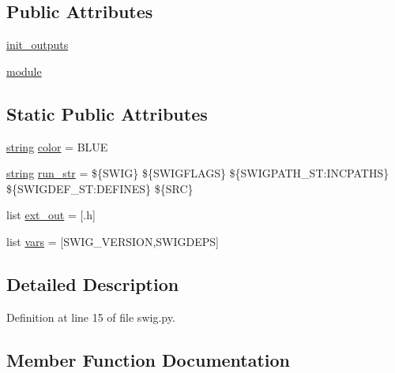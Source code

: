 \subsection*{Public Attributes}
\begin{DoxyCompactItemize}
\item 
\hyperlink{classwaflib_1_1extras_1_1swig_1_1swig_ac87a5e930d61bca4ddb0ba12c6df5dbd}{init\+\_\+outputs}
\item 
\hyperlink{classwaflib_1_1extras_1_1swig_1_1swig_a6008e295101b80084cb97379fe5d6db2}{module}
\end{DoxyCompactItemize}
\subsection*{Static Public Attributes}
\begin{DoxyCompactItemize}
\item 
\hyperlink{test__lib_f_l_a_c_2format_8c_ab02026ad0de9fb6c1b4233deb0a00c75}{string} \hyperlink{classwaflib_1_1extras_1_1swig_1_1swig_ae039b376a626bf5a5baa086264bb14c3}{color} = \textquotesingle{}B\+L\+UE\textquotesingle{}
\item 
\hyperlink{test__lib_f_l_a_c_2format_8c_ab02026ad0de9fb6c1b4233deb0a00c75}{string} \hyperlink{classwaflib_1_1extras_1_1swig_1_1swig_a0fd93de830f05b89980161c171372191}{run\+\_\+str} = \textquotesingle{}\$\{S\+W\+IG\} \$\{S\+W\+I\+G\+F\+L\+A\+GS\} \$\{S\+W\+I\+G\+P\+A\+T\+H\+\_\+\+S\+T\+:\+I\+N\+C\+P\+A\+T\+HS\} \$\{S\+W\+I\+G\+D\+E\+F\+\_\+\+S\+T\+:\+D\+E\+F\+I\+N\+ES\} \$\{S\+RC\}\textquotesingle{}
\item 
list \hyperlink{classwaflib_1_1extras_1_1swig_1_1swig_ad38ac356433a22c4b8f16c41bd0a1347}{ext\+\_\+out} = \mbox{[}\textquotesingle{}.h\textquotesingle{}\mbox{]}
\item 
list \hyperlink{classwaflib_1_1extras_1_1swig_1_1swig_a2bca66555c896d99be4639d0ca4d9323}{vars} = \mbox{[}\textquotesingle{}S\+W\+I\+G\+\_\+\+V\+E\+R\+S\+I\+ON\textquotesingle{},\textquotesingle{}S\+W\+I\+G\+D\+E\+PS\textquotesingle{}\mbox{]}
\end{DoxyCompactItemize}


\subsection{Detailed Description}


Definition at line 15 of file swig.\+py.



\subsection{Member Function Documentation}
